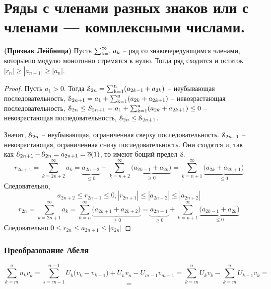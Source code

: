 \chapter[Не только положительные ряды]{Ряды с членами разных знаков или с членами --- комплексными числами.}

\begin{thm}
\textbf{(Признак Лейбница)} Пусть $\operatorname{\sum_{k=1}^{\infty}} a_k$ -- ряд со знакочередующимся членами,
которыепо модулю монотонно стремятся к нулю.
Тогда ряд сходится и остаток $|r_n| \ge |a_{n+1}| \ge |a_n|$.
\end{thm}
\begin{proof}
Пусть $a_1 > 0$. Тогда $\operatorname{\EuScript{S}}_{2n} = \operatorname{\sum_{k=1}^{n}} (a_{2k-1}+a_{2k})$ -- неубывающая последовательность, $\operatorname{\EuScript{S}}_{2n+1} = a_1 + \operatorname{\sum_{k=1}^{n}}(a_{2k} + a_{2k+1})$ -- невозрастающая последовательность,
$\operatorname{\EuScript{S}}_{2n} \le S_{2n+1} = a_1+\operatorname{\sum_{k=1}^{n}}( a_{2k} + a_{2k+1}) \le 0$
-- невозрастающая последовательность, $\operatorname{\EuScript{S}}_{2n} \le \operatorname{\EuScript{S}}_{2n+1}$.

Значит, $\operatorname{\EuScript{S}}_{2n}$ -- неубывающая, ограниченная сверху последовательность.
$\operatorname{\EuScript{S}}_{2n+1}$ -- невозрастающая, ограниченная снизу последовательность.
Они сходятся и, так как $\operatorname{\EuScript{S}}_{2n+1}-\operatorname{\EuScript{S}}_{2n}=a_{2n+1}= \overline{o}(1)$,
то имеют бощий предел $\operatorname{\EuScript{S}}$.
\\
$$r_{2n+1} = \sum_{k=2n+2}^{\infty} a_k =
\underbrace{a_{2n+2}}_{\le 0} +  \sum_{k=n+2}^{\infty}\underbrace{\big(a_{2k-1} + a_{2k}\big)}_{\ge 0} =  \sum_{k=n+1}^{\infty} \underbrace{\big(a_{2k}+a_{2k+1} \big)}_{\le 0}$$
Следовательно,
$$a_{2n+2} \le r_{2n+1} \le0, |r_{2n+1}| \le |a_{2n+2}| \le |a_{2n+2}|$$
$$r_{2n} = \sum_{k=2n+1}^{\infty} a_k = \sum_{k=n}^{\infty} \underbrace{\big( a_{2k+1} + a_{2k+2} \big) }_{\ge 0} =
\underbrace{a_{2n+1}}_{\ge 0} + \sum_{k=n+1}^{\infty} \underbrace{ \big(a_{2k-1} + a_{2k}\big)}_{\le 0}$$
Следовательно $0 \le r_{2n} \le a_{2n+1} \le |a_{2n}|$
\end{proof}
\subsection*{Преобразование Абеля}

$$\sum_{k=m}^n u_k v_k = \sum_{s=m-1}^{n-1} U_k \big( v_k - v_{k+1} \big) + U_nv_n-U_{m-1}v_{m-1} =
\sum_{k=m}^n U_kv_k - \sum_{k=m}^{n}U_{k-1}v_k = $$
$$ = $$
